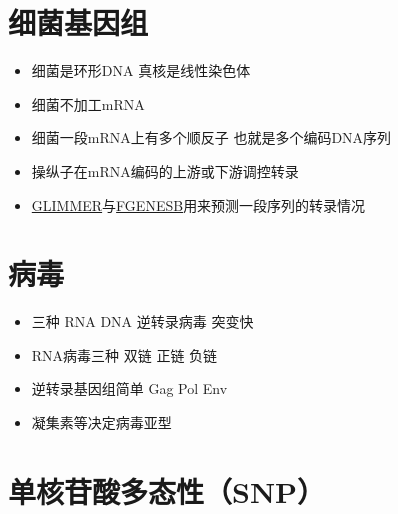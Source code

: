 \documentclass[]{book}
\providecommand{\tightlist}{%
  \setlength{\itemsep}{0pt}\setlength{\parskip}{0pt}}
\begin{document}
\section{细菌基因组}

\begin{itemize}
\tightlist
\item
  细菌是环形DNA 真核是线性染色体
\item
  细菌不加工mRNA
\item
  细菌一段mRNA上有多个顺反子 也就是多个编码DNA序列
\item
  操纵子在mRNA编码的上游或下游调控转录
\item
  \href{http://www.ncbi.nlm.nih.gov/genomes/MICROBES/glimmer_3.cgi}{GLIMMER}与\href{http://www.softberry.com/berry.phtml?topic=fgenesb\&group=programs\&subgroup=gfindb}{FGENESB}用来预测一段序列的转录情况
\end{itemize}

\section{病毒}

\begin{itemize}
\tightlist
\item
  三种 RNA DNA 逆转录病毒 突变快
\item
  RNA病毒三种 双链 正链 负链
\item
  逆转录基因组简单 Gag Pol Env
\item
  凝集素等决定病毒亚型
\end{itemize}

\hypertarget{snp}{%
\section{单核苷酸多态性（SNP）}\label{snp}}
\end{document}
